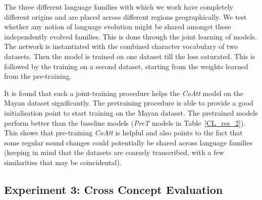 \documentclass[11pt,letterpaper]{article}
\begin{document}
The three different language families with which we work have completely different origins and are placed across different regions geographically. We test whether any notion of language evolution might be shared amongst these independently evolved families. This is done through the joint learning of models. The network is instantiated with the combined character vocabulary of two datasets. Then the model is trained on one dataset till the loss saturated. This is followed by the training on a second dataset, starting from the weights learned from the pre-training. 

It is found that such a joint-training procedure helps the \textit{CoAtt} model on the Mayan dataset significantly. The pretraining procedure is able to provide a good initialisation point to start training on the Mayan dataset. The pretrained models perform better than the baseline models (\textit{PreT} models in Table~\ref{CL_res_2}). This shows that pre-training \textit{CoAtt} is helpful and also points to the fact that some regular sound changes could potentially be shared across language families (keeping in mind that the datasets are coarsely transcribed, with a few similarities that may be coincidental). 


\subsection{Experiment 3: Cross Concept Evaluation}
\end{document}
